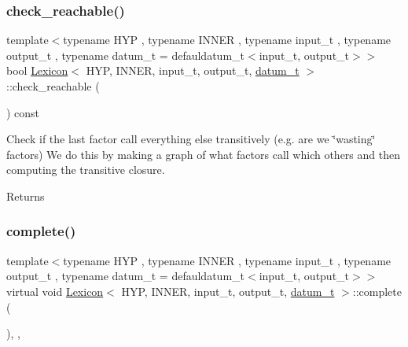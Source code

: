 \mbox{\label{class_lexicon_a1e58bf42fb2388eff629bc899d8ef5ed}} 
\subsubsection{\texorpdfstring{check\+\_\+reachable()}{check\_reachable()}}
{\footnotesize\ttfamily template$<$typename H\+YP , typename I\+N\+N\+ER , typename input\+\_\+t , typename output\+\_\+t , typename datum\+\_\+t  = defauldatum\+\_\+t$<$input\+\_\+t, output\+\_\+t$>$$>$ \\
bool \hyperlink{class_lexicon}{Lexicon}$<$ H\+YP, I\+N\+N\+ER, input\+\_\+t, output\+\_\+t, \hyperlink{class_bayesable_a9f1a6c0cd7855550fa10b1a8f13a5867}{datum\+\_\+t} $>$\+::check\+\_\+reachable (\begin{DoxyParamCaption}{ }\end{DoxyParamCaption}) const\hspace{0.3cm}{\ttfamily [inline]}}

Check if the last factor call everything else transitively (e.\+g. are we \char`\"{}wasting\char`\"{} factors) We do this by making a graph of what factors call which others and then computing the transitive closure. \begin{DoxyReturn}{Returns}

\end{DoxyReturn}
\mbox{\label{class_lexicon_a724ccdaffe9090488bfaa786873fa807}} 
\subsubsection{\texorpdfstring{complete()}{complete()}}
{\footnotesize\ttfamily template$<$typename H\+YP , typename I\+N\+N\+ER , typename input\+\_\+t , typename output\+\_\+t , typename datum\+\_\+t  = defauldatum\+\_\+t$<$input\+\_\+t, output\+\_\+t$>$$>$ \\
virtual void \hyperlink{class_lexicon}{Lexicon}$<$ H\+YP, I\+N\+N\+ER, input\+\_\+t, output\+\_\+t, \hyperlink{class_bayesable_a9f1a6c0cd7855550fa10b1a8f13a5867}{datum\+\_\+t} $>$\+::complete (\begin{DoxyParamCaption}{ }\end{DoxyParamCaption})\hspace{0.3cm}{\ttfamily [inline]}, {\ttfamily [override]}, {\ttfamily [virtual]}}



